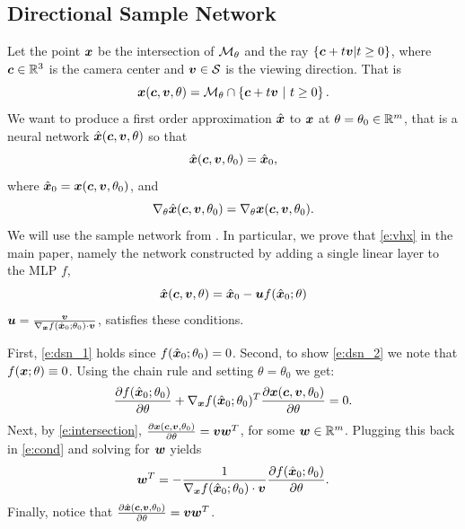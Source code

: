 \documentclass[runningheads]{llncs}
\begin{document}
\subsection{Directional Sample Network}
Let the point ${\bm{x}}$ be the intersection of ${\mathcal{M}}_\theta$ and the ray $\left\{{\bm{c}}+t{\bm{v}} \vert t\geq 0\right\}$, where ${\bm{c}}\in\mathbb R^3$ is the camera center and ${\bm{v}}\in{\mathcal{S}}$ is the viewing direction. That is 
\begin{equation}\label{e:intersection}
    {\bm{x}}({\bm{c}},{\bm{v}},\theta) = {\mathcal{M}}_\theta \cap \left\{{\bm{c}}+t{\bm{v}} \ \vert \ t\geq 0\right\}.
\end{equation}
We want to produce a first order approximation ${\hat{\bm{x}}}$ to ${\bm{x}}$ at $\theta=\theta_0\in\mathbb R^m$, that is a neural network ${\hat{\bm{x}}}({\bm{c}},{\bm{v}},\theta)$ so that 
\begin{equation}\label{e:dsn_1}
  {\hat{\bm{x}}}({\bm{c}},{\bm{v}},\theta_0)={\hat{\bm{x}}}_0,  
\end{equation}
where ${\hat{\bm{x}}}_0={\bm{x}}({\bm{c}},{\bm{v}},\theta_0)$, and
\begin{equation}\label{e:dsn_2}
  \nabla_\theta {\hat{\bm{x}}}({\bm{c}},{\bm{v}},\theta_0)= \nabla_\theta {\bm{x}}({\bm{c}},{\bm{v}},\theta_0).  
\end{equation}
We will use the sample network from \cite{atzmon2019controlling}.
In particular, we prove that \eqref{e:vhx} in the main paper, namely the network constructed by adding a single linear layer to the MLP $f$,
\begin{equation}\label{e:vhx_app}
    {\hat{\bm{x}}}({\bm{c}},{\bm{v}},\theta) = {\hat{\bm{x}}}_0 - {\bm{u}} f({\hat{\bm{x}}}_0;\theta)
\end{equation}
${\bm{u}}=\frac{{\bm{v}}}{\nabla_{\bm{x}} f({\hat{\bm{x}}}_0;\theta_0) \cdot {\bm{v}}}$, satisfies these conditions. 

First, \eqref{e:dsn_1} holds since $f({\hat{\bm{x}}}_0;\theta_0)=0$. Second, to show \eqref{e:dsn_2} we note that $f({\bm{x}};\theta)\equiv 0$. 
Using the chain rule and setting $\theta=\theta_0$ we get:
\begin{equation}\label{e:cond}
  \frac{\partial f({\hat{\bm{x}}}_0;\theta_0)}{\partial \theta} +  \nabla_{\bm{x}} f({\hat{\bm{x}}}_0;\theta_0)^T\frac{\partial {\bm{x}} ({\bm{c}},{\bm{v}},\theta_0)}{\partial \theta}=0.    
\end{equation}
Next, by \eqref{e:intersection}, $\frac{\partial {\bm{x}}({\bm{c}},{\bm{v}},\theta_0)}{\partial \theta} = {\bm{v}}{\bm{w}}^T$, for some ${\bm{w}}\in\mathbb R^m$. Plugging this back in \eqref{e:cond} and solving for ${\bm{w}}$ yields 
$${\bm{w}}^T=-\frac{1}{\nabla_{\bm{x}} f({\hat{\bm{x}}}_0;\theta_0) \cdot  {\bm{v}}}  \frac{\partial f({\hat{\bm{x}}}_0;\theta_0)}{\partial \theta}.$$
Finally, notice that $\frac{\partial {\hat{\bm{x}}} ({\bm{c}},{\bm{v}},\theta_0)}{\partial \theta}={\bm{v}}{\bm{w}}^T$. 
\end{document}
